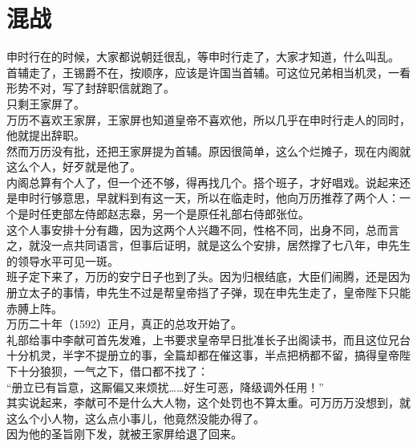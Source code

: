\section{混战}
\ifnum{}
	\begin{multicols}{\theparacolNo}
\fi
申时行在的时候，大家都说朝廷很乱，等申时行走了，大家才知道，什么叫乱。\\

首辅走了，王锡爵不在，按顺序，应该是许国当首辅。可这位兄弟相当机灵，一看形势不对，写了封辞职信就跑了。\\

只剩王家屏了。\\

万历不喜欢王家屏，王家屏也知道皇帝不喜欢他，所以几乎在申时行走人的同时，他就提出辞职。\\

然而万历没有批，还把王家屏提为首辅。原因很简单，这么个烂摊子，现在内阁就这么个人，好歹就是他了。\\

内阁总算有个人了，但一个还不够，得再找几个。搭个班子，才好唱戏。说起来还是申时行够意思，早就料到有这一天，所以在临走时，他向万历推荐了两个人：一个是时任吏部左侍郎赵志皋，另一个是原任礼部右侍郎张位。\\

这个人事安排十分有趣，因为这两个人兴趣不同，性格不同，出身不同，总而言之，就没一点共同语言，但事后证明，就是这么个安排，居然撑了七八年，申先生的领导水平可见一斑。\\

班子定下来了，万历的安宁日子也到了头。因为归根结底，大臣们闹腾，还是因为册立太子的事情，申先生不过是帮皇帝挡了子弹，现在申先生走了，皇帝陛下只能赤膊上阵。\\

万历二十年（1592）正月，真正的总攻开始了。\\

礼部给事中李献可首先发难，上书要求皇帝早日批准长子出阁读书，而且这位兄台十分机灵，半字不提册立的事，全篇却都在催这事，半点把柄都不留，搞得皇帝陛下十分狼狈，一气之下，借口都不找了：\\

“册立已有旨意，这厮偏又来烦扰……好生可恶，降级调外任用！”\\

其实说起来，李献可不是什么大人物，这个处罚也不算太重。可万历万没想到，就这么个小人物，这么点小事儿，他竟然没能办得了。\\

因为他的圣旨刚下发，就被王家屏给退了回来。\\


\end{multicols}
